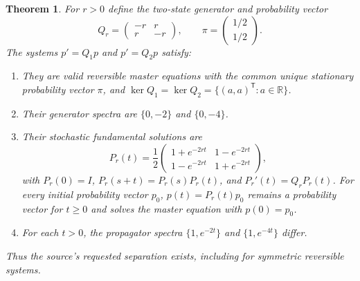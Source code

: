 \documentclass[11pt]{article}
\newtheorem{theorem}{Theorem}
\newcommand{\R}{\mathbb R}
\begin{document}
\begin{theorem}\label{thm:main}
For $r>0$ define the two-state generator and probability vector
\[
 Q_r=\begin{pmatrix}-r&r\\r&-r\end{pmatrix},\qquad
 \pi=\begin{pmatrix}1/2\\1/2\end{pmatrix}.
\]
The systems $p'=Q_1p$ and $p'=Q_2p$ satisfy:
\begin{enumerate}
\item They are valid reversible master equations with the common
unique stationary probability vector $\pi$, and
$\ker Q_1=\ker Q_2=\{(a,a)^{\mathsf T}:a\in\R\}$.
\item Their generator spectra are $\{0,-2\}$ and $\{0,-4\}$.
\item Their stochastic fundamental solutions are
\begin{equation}\label{eq:P}
 P_r(t)=\frac12\begin{pmatrix}
 1+e^{-2rt}&1-e^{-2rt}\\
 1-e^{-2rt}&1+e^{-2rt}
 \end{pmatrix},
\end{equation}
with $P_r(0)=I$, $P_r(s+t)=P_r(s)P_r(t)$, and
$P_r'(t)=Q_rP_r(t)$. For every initial probability vector $p_0$,
$p(t)=P_r(t)p_0$ remains a probability vector for $t\geq0$ and solves
the master equation with $p(0)=p_0$.
\item For each $t>0$, the propagator spectra
$\{1,e^{-2t}\}$ and $\{1,e^{-4t}\}$ differ.
\end{enumerate}
Thus the source's requested separation exists, including for symmetric
reversible systems.
\end{theorem}
\end{document}
